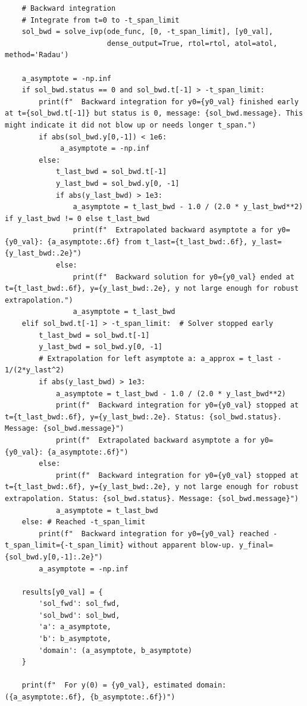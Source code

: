 \documentclass{article}
\begin{document}
\begin{verbatim}
    # Backward integration
    # Integrate from t=0 to -t_span_limit
    sol_bwd = solve_ivp(ode_func, [0, -t_span_limit], [y0_val],
                        dense_output=True, rtol=rtol, atol=atol, method='Radau')

    a_asymptote = -np.inf
    if sol_bwd.status == 0 and sol_bwd.t[-1] > -t_span_limit:
        print(f"  Backward integration for y0={y0_val} finished early at t={sol_bwd.t[-1]} but status is 0, message: {sol_bwd.message}. This might indicate it did not blow up or needs longer t_span.")
        if abs(sol_bwd.y[0,-1]) < 1e6:
             a_asymptote = -np.inf
        else:
            t_last_bwd = sol_bwd.t[-1]
            y_last_bwd = sol_bwd.y[0, -1]
            if abs(y_last_bwd) > 1e3:
                a_asymptote = t_last_bwd - 1.0 / (2.0 * y_last_bwd**2) if y_last_bwd != 0 else t_last_bwd
                print(f"  Extrapolated backward asymptote a for y0={y0_val}: {a_asymptote:.6f} from t_last={t_last_bwd:.6f}, y_last={y_last_bwd:.2e}")
            else:
                print(f"  Backward solution for y0={y0_val} ended at t={t_last_bwd:.6f}, y={y_last_bwd:.2e}, y not large enough for robust extrapolation.")
                a_asymptote = t_last_bwd
    elif sol_bwd.t[-1] > -t_span_limit:  # Solver stopped early
        t_last_bwd = sol_bwd.t[-1]
        y_last_bwd = sol_bwd.y[0, -1]
        # Extrapolation for left asymptote a: a_approx = t_last - 1/(2*y_last^2)
        if abs(y_last_bwd) > 1e3:
            a_asymptote = t_last_bwd - 1.0 / (2.0 * y_last_bwd**2)
            print(f"  Backward integration for y0={y0_val} stopped at t={t_last_bwd:.6f}, y={y_last_bwd:.2e}. Status: {sol_bwd.status}. Message: {sol_bwd.message}")
            print(f"  Extrapolated backward asymptote a for y0={y0_val}: {a_asymptote:.6f}")
        else:
            print(f"  Backward integration for y0={y0_val} stopped at t={t_last_bwd:.6f}, y={y_last_bwd:.2e}, y not large enough for robust extrapolation. Status: {sol_bwd.status}. Message: {sol_bwd.message}")
            a_asymptote = t_last_bwd
    else: # Reached -t_span_limit
        print(f"  Backward integration for y0={y0_val} reached -t_span_limit={-t_span_limit} without apparent blow-up. y_final={sol_bwd.y[0,-1]:.2e}")
        a_asymptote = -np.inf

    results[y0_val] = {
        'sol_fwd': sol_fwd,
        'sol_bwd': sol_bwd,
        'a': a_asymptote,
        'b': b_asymptote,
        'domain': (a_asymptote, b_asymptote)
    }

    print(f"  For y(0) = {y0_val}, estimated domain: ({a_asymptote:.6f}, {b_asymptote:.6f})")


\end{verbatim}
\end{document}
